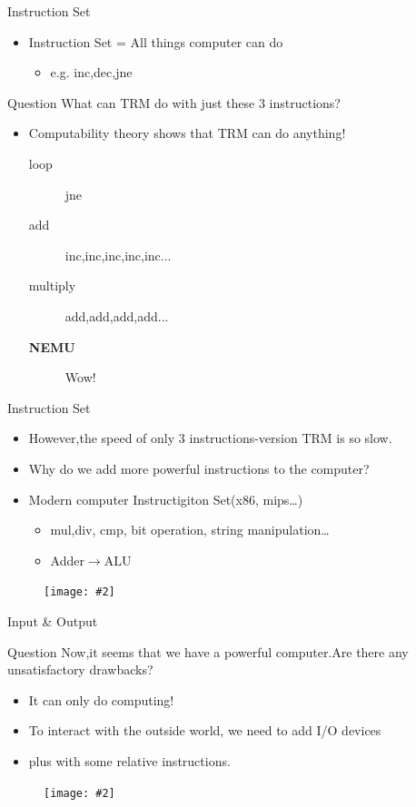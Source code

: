 \documentclass{beamer}
\newcommand{\fignocaption}[2]{
	\begin{figure}[htp]
		\centering
		\texttt{[image: \#2]}
	\end{figure}
}
\begin{document}
\begin{frame}{Instruction Set}
	\begin{itemize}
		\item \alert{Instruction Set = All things computer can do}
		\begin{itemize}
			\item	e.g. inc,dec,jne
		\end{itemize}

\end{itemize}

\begin{block}{Question}
	What can TRM do with just these 3 instructions?
\end{block}
\pause
\begin{itemize}
		\item Computability theory shows that TRM can do anything!
		\begin{description}
			\item [loop]  jne
			\item [add] inc,inc,inc,inc,inc...
			\item [multiply] add,add,add,add...
			\item [\textbf{NEMU}] Wow!
		\end{description}

	\end{itemize}

\end{frame}

\begin{frame}{Instruction Set}
	\begin{itemize}
		\item However,the speed of only 3 instructions-version TRM is so slow.
		\item Why do we add more powerful instructions to the computer?
		\item \alert{Modern computer Instructigiton Set}(x86, mips…)
		\begin{itemize}
			\item mul,div, cmp, bit operation, string manipulation…
			\item Adder$\longrightarrow$ALU
		\end{itemize}

	\end{itemize}
	\fignocaption{scale=0.4}{modernisa.png}
\end{frame}

\begin{frame}{Input \& Output}
	\begin{block}{Question}
		Now,it seems that we have a powerful computer.Are there any unsatisfactory drawbacks?
	\end{block}
	\begin{itemize}
		\pause
		\item It can only do computing!
		\item To interact with the outside world, \alert{we need to add I/O devices}
		\item plus with some relative instructions.
	\end{itemize}

	\fignocaption{scale=0.4}{io.png}
\end{frame}
\end{document}
